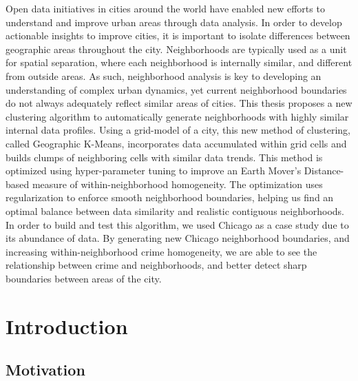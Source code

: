 \documentclass[times new roman,12pt]{article}
\begin{document}
Open data initiatives in cities around the world have enabled new efforts to understand and improve urban areas through data analysis. In order to develop actionable insights to improve cities, it is important to isolate differences between geographic areas throughout the city. Neighborhoods are typically used as a unit for spatial separation, where each neighborhood is internally similar, and different from outside areas. As such, neighborhood analysis is key to developing an understanding of complex urban dynamics, yet current neighborhood boundaries do not always adequately reflect similar areas of cities. This thesis proposes a new clustering algorithm to automatically generate neighborhoods with highly similar internal data profiles. Using a grid-model of a city, this new method of clustering, called Geographic K-Means, incorporates data accumulated within grid cells and builds clumps of neighboring cells with similar data trends. This method is optimized using hyper-parameter tuning to improve an Earth Mover's Distance-based measure of within-neighborhood homogeneity. The optimization uses regularization to enforce smooth neighborhood boundaries, helping us find an optimal balance between data similarity and realistic contiguous neighborhoods. In order to build and test this algorithm, we used Chicago as a case study due to its abundance of data. By generating new Chicago neighborhood boundaries, and increasing within-neighborhood crime homogeneity, we are able to see the relationship between crime and neighborhoods, and better detect sharp boundaries between areas of the city.

\vspace{45mm}




\newpage

\section{Introduction}

\subsection{Motivation}
\end{document}
